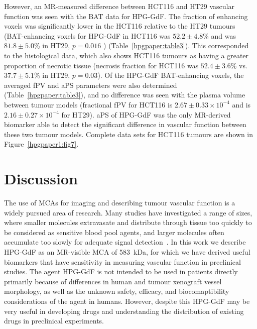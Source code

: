 However, an MR-measured difference between HCT116 and HT29 vascular function was seen with the \acs{BAT} data for \acs{HPG-GdF}.
The fraction of enhancing voxels was significantly lower in the HCT116 relative to the HT29 tumours (BAT-enhancing voxels for \acs{HPG-GdF} in HCT116 was $52.2\pm 4.8$\% and was $81.8\pm 5.0$\% in HT29, $p=0.016$ ) (Table~\ref{hpgpaper:table3}).
This corresponded to the histological data, which also shows HCT116 tumours as having a greater proportion of necrotic tissue (necrosis fraction for HCT116 was $52.4\pm 3.6$\% vs. $37.7\pm 5.1$\% in HT29, $p=0.03$).
Of the \acs{HPG-GdF} \acs{BAT}-enhancing voxels, the averaged \acs{fPV} and \acs{aPS} parameters were also determined (Table~\ref{hpgpaper:table3}), and no difference was seen with the plasma volume between tumour models (fractional \acs{fPV} for HCT116 is $2.67\pm 0.33\times10^{-4}$ and is $2.16\pm 0.27 \times10^{-4}$ for HT29).
\acs{aPS} of \acs{HPG-GdF} was the only MR-derived biomarker able to detect the significant difference in vascular function between these two tumour models.
Complete data sets for HCT116 tumours are shown in Figure~\ref{hpgpaper1:fig7}.

\section{Discussion}

The use of \acs{MCA}s for imaging and describing tumour vascular function is a widely pursued area of research.
Many studies have investigated a range of sizes, where smaller molecules extravasate and distribute through tissue too quickly to be considered as sensitive blood pool agents, and larger molecules often accumulate too slowly for adequate signal detection~\cite{Kyle:2007ch,Tang:2013fi,Sourbron:2011ce}.
In this work we describe \acs{HPG-GdF} as an MR-visible \acs{MCA} of 583~\acs{kDa}, for which we have derived useful biomarkers that have sensitivity in measuring vascular function in preclinical studies.
The agent HPG-GdF is not intended to be used in patients directly primarily because of differences in human and tumour xenograft vessel morphology, as well as the unknown safety, efficacy, and biocomaptibility considerations of the agent in humans.
However, despite this \acs{HPG-GdF} may be very useful in developing drugs and understanding the distribution of existing drugs in preclinical experiments.

